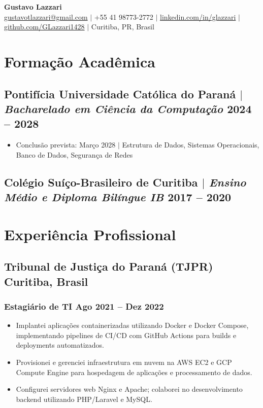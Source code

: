 \documentclass[11.5pt]{article}
\begin{document}
\begin{center}
	{\LARGE\bfseries Gustavo Lazzari} \\
	\vspace{2pt}
	\href{mailto:gustavotlazzari@gmail.com}{gustavotlazzari@gmail.com} $|$
	+55 41 98773-2772 $|$
	\href{https://www.linkedin.com/in/glazzari}{linkedin.com/in/glazzari} $|$
	\href{https://github.com/GLazzari1428}{github.com/GLazzari1428} $|$
	Curitiba, PR, Brasil
\end{center}

\section{Forma\c{c}\~{a}o Acad\^{e}mica}
\subsection{Pontif\'{i}cia Universidade Cat\'{o}lica do Paran\'{a} $|$ {\normalfont\itshape Bacharelado em Ci\^{e}ncia da Computa\c{c}\~{a}o} \hfill 2024 -- 2028}
\begin{itemize}
	\item Conclus\~{a}o prevista: Mar\c{c}o 2028 $|$ Estrutura de Dados, Sistemas Operacionais, Banco de Dados, Seguran\c{c}a de Redes
\end{itemize}
\subsection{Col\'{e}gio Su\'{i}\c{c}o-Brasileiro de Curitiba $|$ {\normalfont\itshape Ensino M\'{e}dio e Diploma Bil\'{i}ngue IB} \hfill 2017 -- 2020}

\section{Experi\^{e}ncia Profissional}
\subsection{Tribunal de Justi\c{c}a do Paran\'{a} (TJPR) \hfill Curitiba, Brasil}
\subsubsection{Estagi\'{a}rio de TI \hfill Ago 2021 -- Dez 2022}
\begin{itemize}
	\item Implantei aplica\c{c}\~{o}es containerizadas utilizando Docker e Docker Compose, implementando pipelines de CI/CD com GitHub Actions para builds e deployments automatizados.
	\item Provisionei e gerenciei infraestrutura em nuvem na AWS EC2 e GCP Compute Engine para hospedagem de aplica\c{c}\~{o}es e processamento de dados.
	\item Configurei servidores web Nginx e Apache; colaborei no desenvolvimento backend utilizando PHP/Laravel e MySQL.
\end{itemize}
\end{document}
